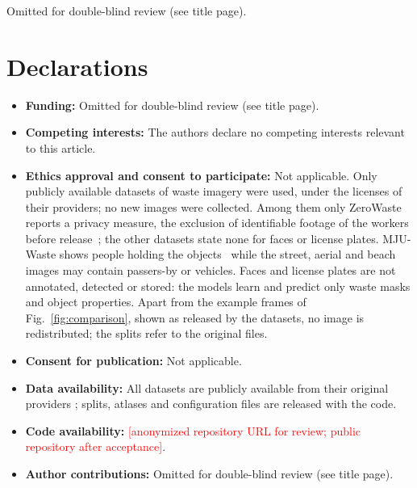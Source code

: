 \documentclass[pdflatex,sn-basic,Numbered]{sn-jnl}%
\newcommand{\tbd}[1]{\textcolor{red}{[#1]}}
\begin{document}
\backmatter

Omitted for double-blind review (see title page).

\section*{Declarations}

\begin{itemize}
\item \textbf{Funding:} Omitted for double-blind review (see title page).
\item \textbf{Competing interests:} The authors declare no competing interests relevant to this article.
\item \textbf{Ethics approval and consent to participate:} Not applicable. Only publicly available datasets of waste imagery were used, under the licenses of their providers; no new images were collected. Among them only ZeroWaste reports a privacy measure, the exclusion of identifiable footage of the workers before release~\cite{bashkirova2022zerowaste}; the other datasets state none for faces or license plates. MJU-Waste shows people holding the objects~\cite{wang2020mjuwaste} while the street, aerial and beach images may contain passers-by or vehicles. Faces and license plates are not annotated, detected or stored: the models learn and predict only waste masks and object properties. Apart from the example frames of Fig.~\ref{fig:comparison}, shown as released by the datasets, no image is redistributed; the splits refer to the original files.
\item \textbf{Consent for publication:} Not applicable.
\item \textbf{Data availability:} All datasets are publicly available from their original providers \cite{proenca2020taco,bashkirova2022zerowaste,kraft2021uavvaste,wang2020mjuwaste,bepli2023}; splits, atlases and configuration files are released with the code.
\item \textbf{Code availability:} \tbd{anonymized repository URL for review; public repository after acceptance}.
\item \textbf{Author contributions:} Omitted for double-blind review (see title page).
\end{itemize}


\end{document}
